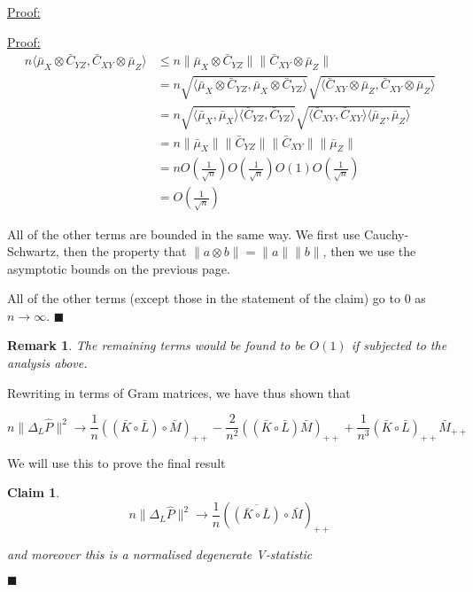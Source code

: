 \documentclass[12pt]{article}
\newtheorem*{remark}{Remark}
\newtheorem{claim}{Claim}
\newenvironment{claimproof}[1]{\par\noindent\underline{Proof:}\space#1}{\hfill $\blacksquare$}
\numberwithin{claim}{section}
\numberwithin{lemma}{section}
\numberwithin{theorem}{section}
\begin{document}
\begin{claimproof}
\begin{claimproof}
\begin{align*}
n\langle \bar{\mu}_X\otimes\bar{C}_{YZ},\bar{C}_{XY}\otimes\bar{\mu}_Z \rangle &\leq n \| \bar{\mu}_X\otimes\bar{C}_{YZ}\| \|\bar{C}_{XY}\otimes\bar{\mu}_Z \| \\
& = n\sqrt{\langle \bar{\mu}_X\otimes\bar{C}_{YZ} , \bar{\mu}_X\otimes\bar{C}_{YZ} \rangle} \sqrt{\langle \bar{C}_{XY}\otimes\bar{\mu}_Z, \bar{C}_{XY}\otimes\bar{\mu}_Z \rangle} \\
& = n\sqrt{\langle \bar{\mu}_X, \bar{\mu}_X \rangle \langle \bar{C}_{YZ} , \bar{C}_{YZ} \rangle} \sqrt{\langle \bar{C}_{XY}, \bar{C}_{XY} \rangle \langle \bar{\mu}_Z, \bar{\mu}_Z \rangle} \\
& =  n \| \bar{\mu}_X\|\|\bar{C}_{YZ}\| \|\bar{C}_{XY}\|\|\bar{\mu}_Z \| \\
& = n O(\frac{1}{\sqrt{n}}) O(\frac{1}{\sqrt{n}}) O(1) O(\frac{1}{\sqrt{n}})\\
& = O(\frac{1}{\sqrt{n}})
\end{align*}

All of the other terms are bounded in the same way. We first use Cauchy-Schwartz, then the property that $\|a \otimes b \| = \|a \| \|b \|$, then we use the asymptotic bounds on the previous page.

All of the other terms (except those in the statement of the claim) go to 0 as $n \longrightarrow \infty$.
\end{claimproof}

\begin{remark}
The remaining terms would be found to be $O(1)$ if subjected to the analysis above. %
\end{remark}

Rewriting in terms of Gram matrices, we have thus shown that 

\[n\|\Delta_L \hat{P}\|^2 \longrightarrow \frac{1}{n}((\bar{K}\circ \bar{L}) \circ \bar{M})_{++} - \frac{2}{n^2}((\bar{K}\circ \bar{L})\bar{M})_{++} + \frac{1}{n^3}(\bar{K}\circ \bar{L})_{++}\bar{M}_{++}\]

We will use this to prove the final result

\begin{claim}

\[n\|\Delta_L \hat{P}\|^2 \longrightarrow \frac{1}{n}(\overline{(\bar{K}\circ \bar{L})} \circ \bar{M})_{++} \]

and moreover this is a normalised degenerate V-statistic
\end{claim}


\end{claimproof}
\end{document}
